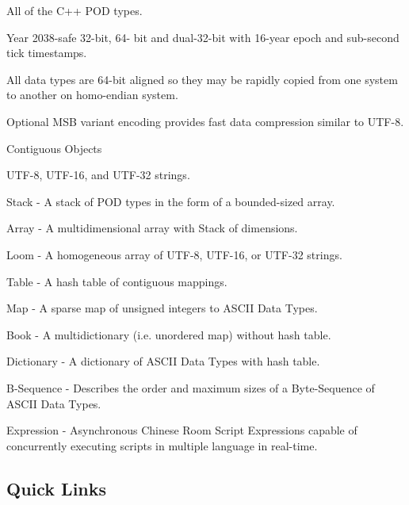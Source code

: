 \begin{DoxyItemize}
\item All of the C++ P\+OD types.
\item Year 2038-\/safe 32-\/bit, 64-\/ bit and dual-\/32-\/bit with 16-\/year epoch and sub-\/second tick timestamps.
\item All data types are 64-\/bit aligned so they may be rapidly copied from one system to another on homo-\/endian system.
\item Optional M\+SB variant encoding provides fast data compression similar to U\+T\+F-\/8.
\item Contiguous Objects
\begin{DoxyItemize}
\item U\+T\+F-\/8, U\+T\+F-\/16, and U\+T\+F-\/32 strings.
\item Stack -\/ A stack of P\+OD types in the form of a bounded-\/sized array.
\item Array -\/ A multidimensional array with Stack of dimensions.
\item Loom -\/ A homogeneous array of U\+T\+F-\/8, U\+T\+F-\/16, or U\+T\+F-\/32 strings.
\item Table -\/ A hash table of contiguous mappings.
\item Map -\/ A sparse map of unsigned integers to A\+S\+C\+II Data Types.
\item Book -\/ A multidictionary (i.\+e. unordered map) without hash table.
\item Dictionary -\/ A dictionary of A\+S\+C\+II Data Types with hash table.
\item B-\/\+Sequence -\/ Describes the order and maximum sizes of a Byte-\/\+Sequence of A\+S\+C\+II Data Types.
\item Expression -\/ Asynchronous Chinese Room Script Expressions capable of concurrently executing scripts in multiple language in real-\/time.
\end{DoxyItemize}
\end{DoxyItemize}

\subsection*{Quick Links}


